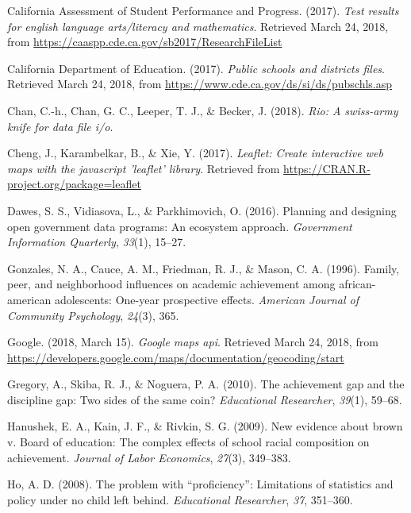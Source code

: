 \documentclass[man, fleqn, noextraspace]{apa6}
\theoremstyle{definition}
\theoremstyle{definition}
\theoremstyle{definition}
\theoremstyle{remark}
\begin{document}
\leavevmode\hypertarget{ref-ca17a}{}%
California Assessment of Student Performance and Progress. (2017).
\emph{Test results for english language arts/literacy and mathematics}.
Retrieved March 24, 2018, from
\url{https://caaspp.cde.ca.gov/sb2017/ResearchFileList}

\leavevmode\hypertarget{ref-ca17b}{}%
California Department of Education. (2017). \emph{Public schools and
districts files}. Retrieved March 24, 2018, from
\url{https://www.cde.ca.gov/ds/si/ds/pubschls.asp}

\leavevmode\hypertarget{ref-rio}{}%
Chan, C.-h., Chan, G. C., Leeper, T. J., \& Becker, J. (2018).
\emph{Rio: A swiss-army knife for data file i/o}.

\leavevmode\hypertarget{ref-leaflet}{}%
Cheng, J., Karambelkar, B., \& Xie, Y. (2017). \emph{Leaflet: Create
interactive web maps with the javascript 'leaflet' library}. Retrieved
from \url{https://CRAN.R-project.org/package=leaflet}

\leavevmode\hypertarget{ref-dawes16}{}%
Dawes, S. S., Vidiasova, L., \& Parkhimovich, O. (2016). Planning and
designing open government data programs: An ecosystem approach.
\emph{Government Information Quarterly}, \emph{33}(1), 15--27.

\leavevmode\hypertarget{ref-gonzales96}{}%
Gonzales, N. A., Cauce, A. M., Friedman, R. J., \& Mason, C. A. (1996).
Family, peer, and neighborhood influences on academic achievement among
african-american adolescents: One-year prospective effects.
\emph{American Journal of Community Psychology}, \emph{24}(3), 365.

\leavevmode\hypertarget{ref-google}{}%
Google. (2018, March 15). \emph{Google maps api}. Retrieved March 24,
2018, from
\url{https://developers.google.com/maps/documentation/geocoding/start}

\leavevmode\hypertarget{ref-gregory10}{}%
Gregory, A., Skiba, R. J., \& Noguera, P. A. (2010). The achievement gap
and the discipline gap: Two sides of the same coin? \emph{Educational
Researcher}, \emph{39}(1), 59--68.

\leavevmode\hypertarget{ref-hanushek09}{}%
Hanushek, E. A., Kain, J. F., \& Rivkin, S. G. (2009). New evidence
about brown v. Board of education: The complex effects of school racial
composition on achievement. \emph{Journal of Labor Economics},
\emph{27}(3), 349--383.

\leavevmode\hypertarget{ref-ho08}{}%
Ho, A. D. (2008). The problem with ``proficiency'': Limitations of
statistics and policy under no child left behind. \emph{Educational
Researcher}, \emph{37}, 351--360.
\end{document}
